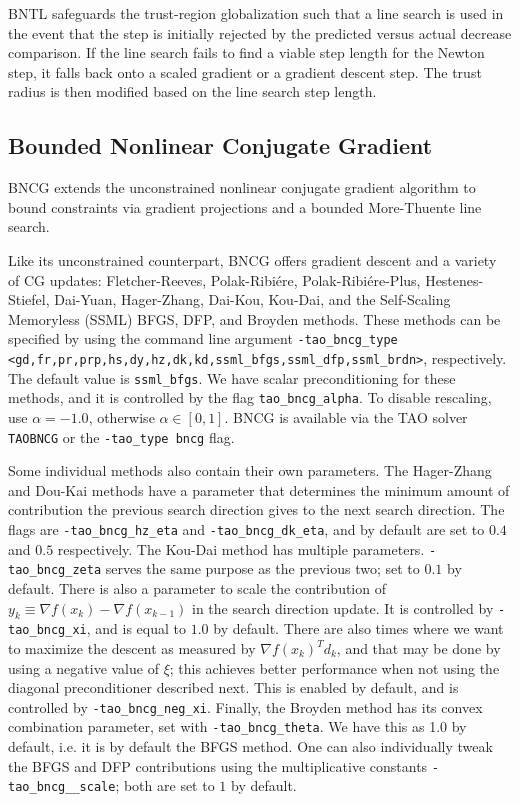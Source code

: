 BNTL safeguards the trust-region globalization such that a line search is used in the event that 
the step is initially rejected by the predicted versus actual decrease comparison. If the line 
search fails to find a viable step length for the Newton step, it falls back onto a scaled gradient 
or a gradient descent step. The trust radius is then modified based on the line search step length.

\subsection{Bounded Nonlinear Conjugate Gradient}
\label{sec:bncg}

BNCG extends the unconstrained nonlinear conjugate gradient algorithm to 
bound constraints via gradient projections and a bounded More-Thuente line search. 

Like its unconstrained counterpart, BNCG offers gradient descent and a variety of CG updates: 
Fletcher-Reeves, Polak-Ribi\'ere, Polak-Ribi\'ere-Plus, Hestenes-Stiefel, Dai-Yuan,
Hager-Zhang, Dai-Kou, Kou-Dai, and the Self-Scaling Memoryless (SSML) BFGS, DFP,
and Broyden methods.
These methods can be specified by using the command line argument 
{\tt -tao\_bncg\_type <gd,fr,pr,prp,hs,dy,hz,dk,kd,ssml\_bfgs,ssml\_dfp,ssml\_brdn>},
respectively. The default value is {\tt ssml\_bfgs}. We have scalar preconditioning for
these methods, and it is controlled by the flag {\tt tao\_bncg\_alpha}. To disable
rescaling, use $\alpha = -1.0$, otherwise $\alpha \in [0, 1]$.
BNCG is available via the TAO solver {\tt TAOBNCG} or the {\tt -tao\_type bncg} flag.

Some individual methods also contain their own parameters. The Hager-Zhang and Dou-Kai
 methods have a parameter that determines the minimum amount of contribution the previous
 search direction gives to the next search direction. The flags are
{\tt -tao\_bncg\_hz\_eta} and {\tt -tao\_bncg\_dk\_eta}, and by default are set to $0.4$ 
and $0.5$ respectively. The Kou-Dai method has multiple parameters.
{\tt -tao\_bncg\_zeta} serves the same purpose as the previous two; set to $0.1$ 
by default. There is also a parameter to scale the contribution of 
$y_k \equiv \nabla f(x_k) - \nabla f(x_{k-1}) $ in the search direction update. 
It is controlled by {\tt -tao\_bncg\_xi}, and is equal to $1.0$ by default. 
There are also times where we want to maximize the descent as measured 
by $\nabla f(x_k)^T d_k$, and that may be done by using a negative value of 
$\xi$; this achieves better performance when not using the diagonal preconditioner
described next. This is enabled by default, and is controlled by 
{\tt -tao\_bncg\_neg\_xi}. Finally, the Broyden method has its convex combination
parameter, set with {\tt -tao\_bncg\_theta}. We have this as 1.0 by 
default, i.e. it is by default the BFGS method. One can also individually 
tweak the BFGS and DFP contributions using the multiplicative constants 
{\tt -tao\_bncg\_<bfgs,dfp>\_scale}; both are set to $1$ by default.

